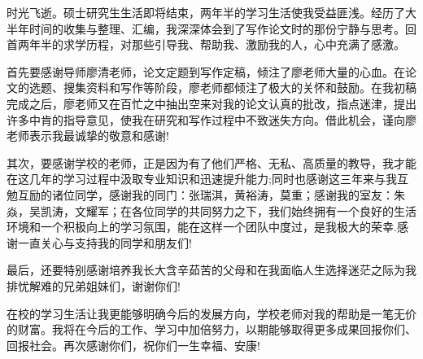 \begin{acknowledgements}
    时光飞逝。硕士研究生生活即将结束，两年半的学习生活使我受益匪浅。经历了大半年时间的收集与整理、汇编，我深深体会到了写作论文时的那份宁静与思考。回首两年半的求学历程，对那些引导我、帮助我、激励我的人，心中充满了感激。

    首先要感谢导师廖清老师，论文定题到写作定稿，倾注了廖老师大量的心血。在论文的选题、搜集资料和写作等阶段，廖老师都倾注了极大的关怀和鼓励。在我初稿完成之后，廖老师又在百忙之中抽出空来对我的论文认真的批改，指点迷津，提出许多中肯的指导意见，使我在研究和写作过程中不致迷失方向。借此机会，谨向廖老师表示我最诚挚的敬意和感谢!
    
    其次，要感谢学校的老师，正是因为有了他们严格、无私、高质量的教导，我才能在这几年的学习过程中汲取专业知识和迅速提升能力;同时也感谢这三年来与我互勉互励的诸位同学，感谢我的同门：张瑞淇，黄裕涛，莫重；感谢我的室友：朱焱，吴凯涛，文耀军；在各位同学的共同努力之下，我们始终拥有一个良好的生活环境和一个积极向上的学习氛围，能在这样一个团队中度过，是我极大的荣幸.感谢一直关心与支持我的同学和朋友们!
    
    最后，还要特别感谢培养我长大含辛茹苦的父母和在我面临人生选择迷茫之际为我排忧解难的兄弟姐妹们，谢谢你们!
    
    在校的学习生活让我更能够明确今后的发展方向，学校老师对我的帮助是一笔无价的财富。我将在今后的工作、学习中加倍努力，以期能够取得更多成果回报你们、回报社会。再次感谢你们，祝你们一生幸福、安康!

\end{acknowledgements}
